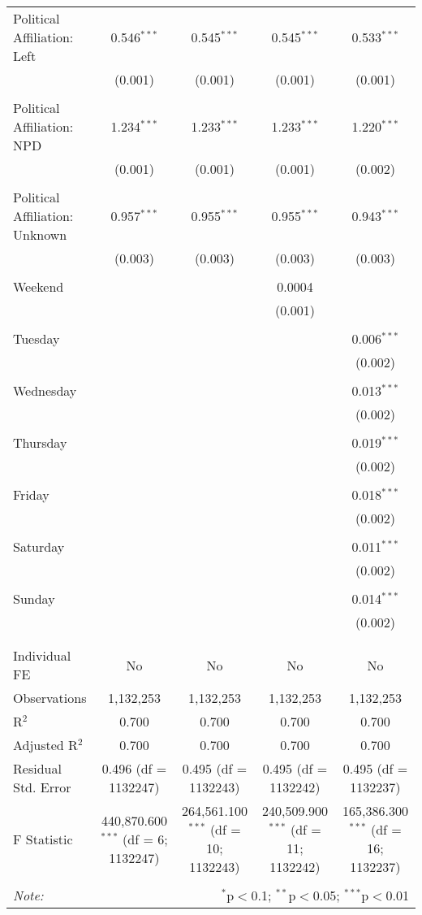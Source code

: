 \documentclass[
]{article}
\begin{document}
\begin{table}[!htbp]
{\begin{tabular}{@{\extracolsep{5pt}}lcccc}
 Political Affiliation: Left & 0.546$^{***}$ & 0.545$^{***}$ & 0.545$^{***}$ & 0.533$^{***}$ \\ 
  & (0.001) & (0.001) & (0.001) & (0.001) \\ 
  & & & & \\ 
 Political Affiliation: NPD & 1.234$^{***}$ & 1.233$^{***}$ & 1.233$^{***}$ & 1.220$^{***}$ \\ 
  & (0.001) & (0.001) & (0.001) & (0.002) \\ 
  & & & & \\ 
 Political Affiliation: Unknown & 0.957$^{***}$ & 0.955$^{***}$ & 0.955$^{***}$ & 0.943$^{***}$ \\ 
  & (0.003) & (0.003) & (0.003) & (0.003) \\ 
  & & & & \\ 
 Weekend &  &  & 0.0004 &  \\ 
  &  &  & (0.001) &  \\ 
  & & & & \\ 
 Tuesday &  &  &  & 0.006$^{***}$ \\ 
  &  &  &  & (0.002) \\ 
  & & & & \\ 
 Wednesday &  &  &  & 0.013$^{***}$ \\ 
  &  &  &  & (0.002) \\ 
  & & & & \\ 
 Thursday &  &  &  & 0.019$^{***}$ \\ 
  &  &  &  & (0.002) \\ 
  & & & & \\ 
 Friday &  &  &  & 0.018$^{***}$ \\ 
  &  &  &  & (0.002) \\ 
  & & & & \\ 
 Saturday &  &  &  & 0.011$^{***}$ \\ 
  &  &  &  & (0.002) \\ 
  & & & & \\ 
 Sunday &  &  &  & 0.014$^{***}$ \\ 
  &  &  &  & (0.002) \\ 
  & & & & \\ 
\hline \\[-1.8ex] 
Individual FE & No & No & No & No \\ 
Observations & 1,132,253 & 1,132,253 & 1,132,253 & 1,132,253 \\ 
R$^{2}$ & 0.700 & 0.700 & 0.700 & 0.700 \\ 
Adjusted R$^{2}$ & 0.700 & 0.700 & 0.700 & 0.700 \\ 
Residual Std. Error & 0.496 (df = 1132247) & 0.495 (df = 1132243) & 0.495 (df = 1132242) & 0.495 (df = 1132237) \\ 
F Statistic & 440,870.600$^{***}$ (df = 6; 1132247) & 264,561.100$^{***}$ (df = 10; 1132243) & 240,509.900$^{***}$ (df = 11; 1132242) & 165,386.300$^{***}$ (df = 16; 1132237) \\ 
\hline 
\hline \\[-1.8ex] 
\textit{Note:}  & \multicolumn{4}{r}{$^{*}$p$<$0.1; $^{**}$p$<$0.05; $^{***}$p$<$0.01} \\ 
\end{tabular}
} 
\end{table} 
\newpage
\end{document}
